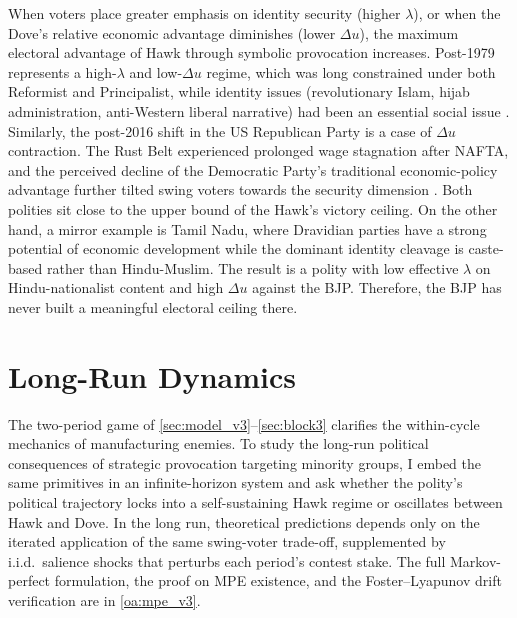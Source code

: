 \documentclass[11pt,twoside]{extarticle}
\begin{document}
When voters place greater emphasis on identity security (higher $\lambda$), or when the Dove's relative economic advantage diminishes (lower $\Delta u$), the maximum electoral advantage of Hawk through symbolic provocation increases. Post-1979 represents a high-$\lambda$ and low-$\Delta u$ regime, which was long constrained under both Reformist and Principalist, while identity issues (revolutionary Islam, hijab administration, anti-Western liberal narrative) had been an essential social issue \citep*{bajoghliIranReframedAnxieties2020}. 
Similarly, the post-2016 shift in the US Republican Party is a case of $\Delta u$ contraction. The Rust Belt experienced prolonged wage stagnation after NAFTA, and the perceived decline of the Democratic Party's traditional economic-policy advantage further tilted swing voters towards the security dimension \citep*{mutzStatusThreatNot2018,sidesIdentityCrisis20162019}. 
Both polities sit close to the upper bound of the Hawk's victory ceiling.
On the other hand, a mirror example is Tamil Nadu, where Dravidian parties have a strong potential of economic development while the dominant identity cleavage is caste-based rather than Hindu-Muslim. 
The result is a polity with low effective $\lambda$ on Hindu-nationalist content and high $\Delta u$ against the BJP.
Therefore, the BJP has never built a meaningful electoral ceiling there.


\section{Long-Run Dynamics}\label{sec:dynamics_v3}

The two-period game of \autoref{sec:model_v3}--\autoref{sec:block3} clarifies the within-cycle mechanics of manufacturing enemies.
To study the long-run political consequences of strategic provocation targeting minority groups, I embed the same primitives in an infinite-horizon system and ask whether the polity's political trajectory locks into a self-sustaining Hawk regime or oscillates between Hawk and Dove. 
In the long run, theoretical predictions depends only on the iterated application of the same swing-voter trade-off, supplemented by i.i.d.\ salience shocks that perturbs each period's contest stake. 
The full Markov-perfect formulation, the proof on MPE existence, and the Foster--Lyapunov drift verification are in \autoref{oa:mpe_v3}.
\end{document}
